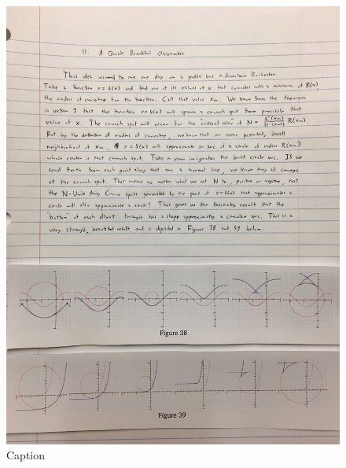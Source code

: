 \begin{figure}[H]
\begin{minipage}[b]{0.9\linewidth}
        \includegraphics[width = .9\linewidth, height = .25 \textheight, keepaspectratio]{beautiful-observation-img/Fig 11-39.png}
        \caption{Caption}
        \label{fig:fig11-39}
    \end{minipage}
\end{figure}